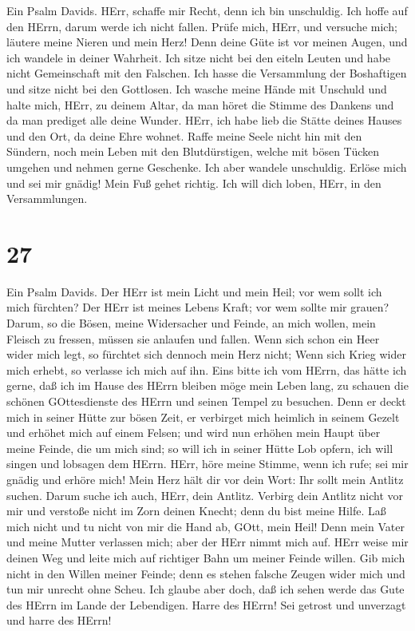  Ein Psalm Davids. HErr, schaffe mir Recht, denn ich bin
unschuldig. Ich hoffe auf den HErrn, darum werde ich nicht fallen.
 Prüfe mich, HErr, und versuche mich; läutere meine Nieren
und mein Herz!  Denn deine Güte ist vor meinen Augen, und
ich wandele in deiner Wahrheit.  Ich sitze nicht bei den
eiteln Leuten und habe nicht Gemeinschaft mit den Falschen. 
Ich hasse die Versammlung der Boshaftigen und sitze nicht bei den
Gottlosen.  Ich wasche meine Hände mit Unschuld und halte
mich, HErr, zu deinem Altar,  da man höret die Stimme des
Dankens und da man prediget alle deine Wunder.  HErr, ich
habe lieb die Stätte deines Hauses und den Ort, da deine Ehre wohnet.
 Raffe meine Seele nicht hin mit den Sündern, noch mein
Leben mit den Blutdürstigen,  welche mit bösen Tücken
umgehen und nehmen gerne Geschenke.  Ich aber wandele
unschuldig. Erlöse mich und sei mir gnädig!  Mein Fuß gehet
richtig. Ich will dich loben, HErr, in den Versammlungen.

\hypertarget{section-26}{%
\section{27}\label{section-26}}

 Ein Psalm Davids. Der HErr ist mein Licht und mein Heil;
vor wem sollt ich mich fürchten? Der HErr ist meines Lebens Kraft; vor
wem sollte mir grauen?  Darum, so die Bösen, meine
Widersacher und Feinde, an mich wollen, mein Fleisch zu fressen, müssen
sie anlaufen und fallen.  Wenn sich schon ein Heer wider
mich legt, so fürchtet sich dennoch mein Herz nicht; Wenn sich Krieg
wider mich erhebt, so verlasse ich mich auf ihn.  Eins bitte
ich vom HErrn, das hätte ich gerne, daß ich im Hause des HErrn bleiben
möge mein Leben lang, zu schauen die schönen GOttesdienste des HErrn und
seinen Tempel zu besuchen.  Denn er deckt mich in seiner
Hütte zur bösen Zeit, er verbirget mich heimlich in seinem Gezelt und
erhöhet mich auf einem Felsen;  und wird nun erhöhen mein
Haupt über meine Feinde, die um mich sind; so will ich in seiner Hütte
Lob opfern, ich will singen und lobsagen dem HErrn.  HErr,
höre meine Stimme, wenn ich rufe; sei mir gnädig und erhöre mich!
 Mein Herz hält dir vor dein Wort: Ihr sollt mein Antlitz
suchen. Darum suche ich auch, HErr, dein Antlitz.  Verbirg
dein Antlitz nicht vor mir und verstoße nicht im Zorn deinen Knecht;
denn du bist meine Hilfe. Laß mich nicht und tu nicht von mir die Hand
ab, GOtt, mein Heil!  Denn mein Vater und meine Mutter
verlassen mich; aber der HErr nimmt mich auf.  HErr weise
mir deinen Weg und leite mich auf richtiger Bahn um meiner Feinde
willen.  Gib mich nicht in den Willen meiner Feinde; denn
es stehen falsche Zeugen wider mich und tun mir unrecht ohne Scheu.
 Ich glaube aber doch, daß ich sehen werde das Gute des
HErrn im Lande der Lebendigen.  Harre des HErrn! Sei
getrost und unverzagt und harre des HErrn!

